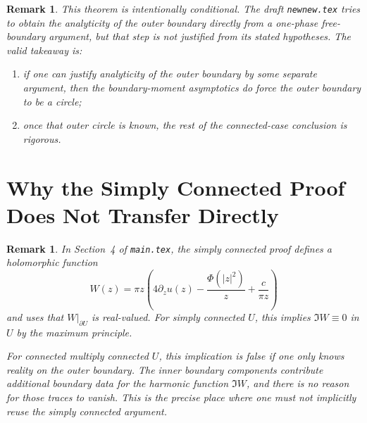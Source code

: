 \documentclass[11pt]{article}
\newtheorem{remark}[theorem]{Remark}
\newcommand{\1}{\mathbf 1}
\begin{document}
\begin{remark}
This theorem is intentionally conditional. The draft \texttt{newnew.tex} tries to obtain the
analyticity of the outer boundary directly from a one-phase free-boundary argument, but that step
is not justified from its stated hypotheses. The valid takeaway is:
\begin{enumerate}[label=\textnormal{(\roman*)}]
\item if one can justify analyticity of the outer boundary by some separate argument, then the
boundary-moment asymptotics do force the outer boundary to be a circle;
\item once that outer circle is known, the rest of the connected-case conclusion is rigorous.
\end{enumerate}
\end{remark}

\section{Why the Simply Connected Proof Does Not Transfer Directly}

\begin{remark}
In Section~4 of \texttt{main.tex}, the simply connected proof defines a holomorphic function
\[
W(z)=\pi z\left(4\partial_z u(z)-\frac{\Phi(|z|^2)}{z}+\frac{c}{\pi z}\right)
\]
and uses that $W|_{\partial U}$ is real-valued. For simply connected $U$, this implies
$\Im W\equiv 0$ in $U$ by the maximum principle.

For connected multiply connected $U$, this implication is false if one only knows reality on the
outer boundary. The inner boundary components contribute additional boundary data for the harmonic
function $\Im W$, and there is no reason for those traces to vanish. This is the precise place
where one must not implicitly reuse the simply connected argument.
\end{remark}
\end{document}
